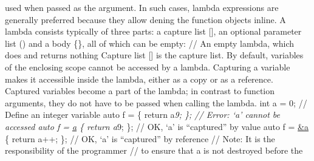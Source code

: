 used when passed as the argument. In such cases, lambda expressions are
generally preferred because they allow dening the function objects
inline. A lambda consists typically of three parts: a capture list
{[}{]}, an optional parameter list () and a body \{\}, all of which can
be empty: \href{}{} // An empty lambda, which does and returns nothing
Capture list {[}{]} is the capture list. By default, variables of the
enclosing scope cannot be accessed by a lambda. Capturing a variable
makes it accessible inside the lambda, either as a copy or as a
reference. Captured variables become a part of the lambda; in contrast
to function arguments, they do not have to be passed when calling the
lambda. int a = 0; // Define an integer variable auto f = \href{}{} \{
return a\emph{9; \}; // Error: `a' cannot be accessed auto f =
\href{}{a} \{ return a}9; \}; // OK, `a' is ``captured'' by value auto f
= \href{}{\&a} \{ return a++; \}; // OK, `a' is ``captured'' by
reference // Note: It is the responsibility of the programmer // to
ensure that a is not destroyed before the

